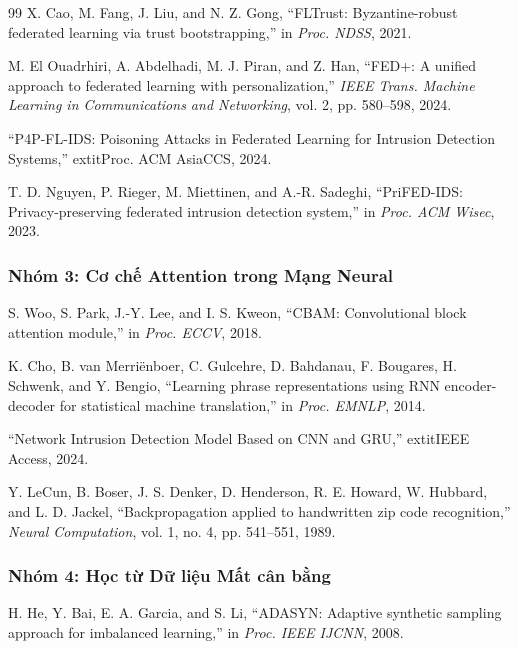 \documentclass[12pt,a4paper]{article}
\begin{document}
\begin{thebibliography}{99}
  X. Cao, M. Fang, J. Liu, and N. Z. Gong, ``FLTrust: Byzantine-robust federated learning via trust bootstrapping,'' in \textit{Proc. NDSS}, 2021.

  M. El Ouadrhiri, A. Abdelhadi, M. J. Piran, and Z. Han, ``FED+: A unified approach to federated learning with personalization,'' \textit{IEEE Trans. Machine Learning in Communications and Networking}, vol. 2, pp. 580--598, 2024.


  ``P4P-FL-IDS: Poisoning Attacks in Federated Learning for Intrusion Detection Systems,'' 	extit{Proc. ACM AsiaCCS}, 2024.

  T. D. Nguyen, P. Rieger, M. Miettinen, and A.-R. Sadeghi, ``PriFED-IDS: Privacy-preserving federated intrusion detection system,'' in \textit{Proc. ACM Wisec}, 2023.

\subsubsection*{Nhóm 3: Cơ chế Attention trong Mạng Neural}

  S. Woo, S. Park, J.-Y. Lee, and I. S. Kweon, ``CBAM: Convolutional block attention module,'' in \textit{Proc. ECCV}, 2018.

  K. Cho, B. van Merriënboer, C. Gulcehre, D. Bahdanau, F. Bougares, H. Schwenk, and Y. Bengio, ``Learning phrase representations using RNN encoder-decoder for statistical machine translation,'' in \textit{Proc. EMNLP}, 2014.


  ``Network Intrusion Detection Model Based on CNN and GRU,'' 	extit{IEEE Access}, 2024.

  Y. LeCun, B. Boser, J. S. Denker, D. Henderson, R. E. Howard, W. Hubbard, and L. D. Jackel, ``Backpropagation applied to handwritten zip code recognition,'' \textit{Neural Computation}, vol. 1, no. 4, pp. 541--551, 1989.

\subsubsection*{Nhóm 4: Học từ Dữ liệu Mất cân bằng}

  H. He, Y. Bai, E. A. Garcia, and S. Li, ``ADASYN: Adaptive synthetic sampling approach for imbalanced learning,'' in \textit{Proc. IEEE IJCNN}, 2008.


\end{thebibliography}
\end{document}
